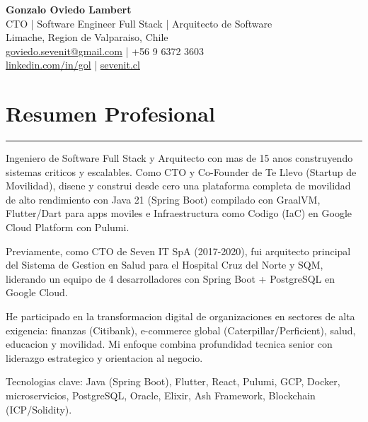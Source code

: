 \documentclass[11pt,a4paper]{article}
\begin{document}
\begin{center}
    {\LARGE \textbf{Gonzalo Oviedo Lambert}} \\
    \vspace{2pt}
    CTO | Software Engineer Full Stack | Arquitecto de Software \\
    \vspace{2pt}
    Limache, Region de Valparaiso, Chile \\
    \vspace{2pt}
    \href{mailto:goviedo.sevenit@gmail.com}{goviedo.sevenit@gmail.com} | +56 9 6372 3603 \\
    \href{https://www.linkedin.com/in/gol}{linkedin.com/in/gol} | \href{https://sevenit.cl/}{sevenit.cl}
\end{center}

\section*{Resumen Profesional}
\hrule
\vspace{5pt}
\noindent
Ingeniero de Software Full Stack y Arquitecto con mas de 15 anos construyendo sistemas criticos y escalables. Como CTO y Co-Founder de Te Llevo (Startup de Movilidad), disene y construi desde cero una plataforma completa de movilidad de alto rendimiento con Java 21 (Spring Boot) compilado con GraalVM, Flutter/Dart para apps moviles e Infraestructura como Codigo (IaC) en Google Cloud Platform con Pulumi.

Previamente, como CTO de Seven IT SpA (2017-2020), fui arquitecto principal del Sistema de Gestion en Salud para el Hospital Cruz del Norte y SQM, liderando un equipo de 4 desarrolladores con Spring Boot + PostgreSQL en Google Cloud.

He participado en la transformacion digital de organizaciones en sectores de alta exigencia: finanzas (Citibank), e-commerce global (Caterpillar/Perficient), salud, educacion y movilidad. Mi enfoque combina profundidad tecnica senior con liderazgo estrategico y orientacion al negocio.

Tecnologias clave: Java (Spring Boot), Flutter, React, Pulumi, GCP, Docker, microservicios, PostgreSQL, Oracle, Elixir, Ash Framework, Blockchain (ICP/Solidity).
\end{document}
